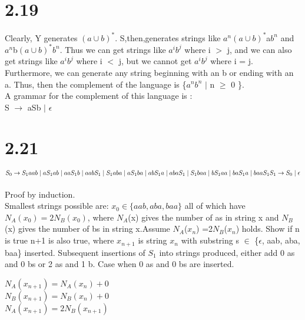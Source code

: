 \documentclass{scrartcl}
\begin{document}
\section*{2.19}
 
Clearly, Y generates $(a \cup b)^*$. S,then,generates strings like $a^n$$(a \cup b)^*$a$b^n$ and $a^n$b$(a \cup b)^*$$b^n$. Thus we can get strings like $a^i$$b^j$ where i $>$ j, and we can also get strings like $a^i$$b^j$ where i $<$ j, but we cannot get $a^i$$b^j$ where i = j. Furthermore, we can generate any string beginning with an b or ending with an a. Thus, then the complement of the language is \{$a^n$$b^n$ $\mid$ n $\geq$ 0 \}.\\
A grammar for the complement of this language is :
\\
S $\rightarrow$ aSb $\mid$ $\epsilon$ 
\section*{2.21}

$S_0\rightarrow S_1aab \mid aS_1ab \mid aaS_1b \mid aabS_1 \mid S_1aba \mid aS_1ba \mid abS_1a \mid abaS_1 \mid S_1baa \mid bS_1aa \mid baS_1a \mid baaS_1\\
S_1\rightarrow S_0 \mid \epsilon$
\\
\\
Proof by induction.\\

Smallest strings possible are: $x_0 \in \{aab, aba, baa\}$ all of which have $N_A(x_0) = 2N_B(x_0)$, where $N_A$(x) gives the number of a\textquotesingle s in string x and $N_B$(x) gives the number of b\textquotesingle s in string x.Assume $N_A$($x_n$) =2$N_B$($x_n$) holds.
Show if n is true n+1 is also true, where $x_{n+1}$ is string $x_n$ with substring s $\in$ \{$\epsilon$, aab, aba, baa\} inserted. Subsequent insertions of $S_1$ into strings produced, either add 0 a\textquotesingle s and 0 b\textquotesingle s or 2 a\textquotesingle s and 1 b.
Case when 0 a\textquotesingle s and 0 b\textquotesingle s are inserted.\\
\begin{center}
	
$N_A(x_{n+1}) = N_A(x_n) + 0$\\
$N_B(x_{n+1}) = N_B(x_n) + 0$\\
$N_A(x_{n+1}) = 2N_B(x_{n+1})
$

\end{center}
\end{document}
